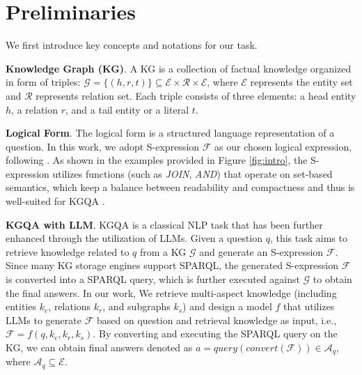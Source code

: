 
\section{Preliminaries} \label{sec:preliminaries}
We first introduce key concepts and notations for our task.

\textbf{Knowledge Graph (KG)}. A KG is a collection of factual knowledge organized in form of triples: $\mathcal{G} =  \{(h,r,t)\} \subseteq \mathcal{E} \times \mathcal{R} \times  \mathcal{E} $, where $\mathcal{E}$ represents the entity set and $\mathcal{R}$ represents relation set. Each triple consists of three elements: a head entity $h$, a relation $r$, and a tail entity or a literal $t$.

\textbf{Logical Form}. The logical form is a structured language representation of a question. In this work, we adopt S-expression $\mathcal{F}$ as our chosen logical expression, following \cite{chatkbqa,decaf}. As shown in the examples provided in Figure \ref{fig:intro}, the S-expression utilizes functions (such as \textit{JOIN}, \textit{AND}) that operate on set-based semantics, which keep a balance between readability and compactness and thus is well-suited for KGQA \cite{gu2021beyond}.

\textbf{KGQA with LLM}. KGQA is a classical NLP task that has been further enhanced through the utilization of LLMs.
Given a question $q$, this task aims to retrieve knowledge related to $q$ from a KG $\mathcal{G}$ and generate an S-expression $\mathcal{F}$. Since many KG storage engines support SPARQL, the generated S-expression $\mathcal{F}$ is converted into a SPARQL query, which is further executed against $\mathcal{G}$ to obtain the final answers. In our work, We retrieve multi-aspect knowledge (including entities $k_e$, relations $k_r$, and subgraphs $k_s$) and design a model $f$ that utilizes LLMs to generate $\mathcal{F}$ based on question and retrieval knowledge as input, i.e., $\mathcal{F} = f(q,k_e,k_r,k_s)$. By converting and executing the SPARQL query on the KG, we can obtain final answers denoted as $a = query(convert(\mathcal{F})) \in \mathcal{A}_q$, where $\mathcal{A}_q \subseteq \mathcal{E}$.


